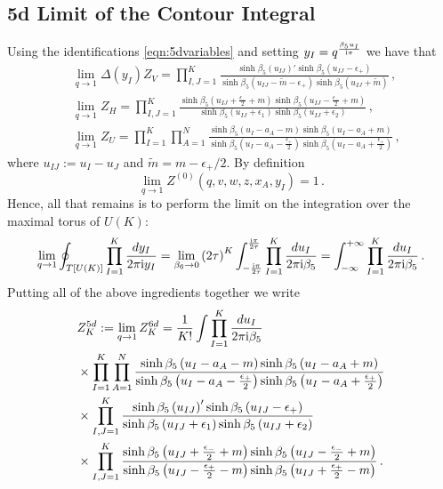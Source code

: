 \documentclass[main.tex]{subfiles}
\begin{document}
\subsection{5d Limit of the Contour Integral}\label{5dLimitOfUnorbifolded}
Using the identifications \eqref{eqn:5dvariables} and setting $y_I=q^{\frac{\beta_5u_I}{\mathrm{i}\pi}}$ we have that
\begin{align}
&\lim_{q\to1}\Delta(y_I)Z_V=\prod_{I,J=1}^K\frac{\sinh\beta_5\left(u_{IJ}\right)'\sinh\beta_5\left(u_{IJ}-\epsilon_+\right)}{\sinh\beta_5\left(u_{IJ}-\tilde{m}-\epsilon_+\right)\sinh\beta_5\left(u_{IJ}+\tilde{m}\right)}\,,\\
&\lim_{q\to1}Z_H=\prod_{I,J=1}^K\frac{\sinh\beta_5\left(u_{IJ}+\frac{\epsilon_-}{2}+m\right)\sinh\beta_5\left(u_{IJ}-\frac{\epsilon_-}{2}+m\right)}{\sinh\beta_5\left(u_{IJ}+\epsilon_1\right)\sinh\beta_5\left(u_{IJ}+\epsilon_2\right)}\,,\\
&\lim_{q\to1}Z_U=\prod_{I=1}^K\prod_{A=1}^N\frac{\sinh\beta_5\left(u_{I}-a_A-m\right)\sinh\beta_5\left(u_{I}-a_A+m\right)}{\sinh\beta_5\left(u_{I}-a_A-\frac{\epsilon_+}{2}\right)\sinh\beta_5\left(u_{I}-a_A+\frac{\epsilon_+}{2}\right)}\,,
\end{align}
where $u_{IJ}:=u_I-u_J$ and $\tilde{m}=m-\epsilon_+/2$.
By definition 
\begin{equation}
\lim_{q\to1}Z^{(0)}(q,v,w,z,x_A,y_I)=1\,.
\end{equation}
Hence, all that remains is to perform the limit on the integration over the maximal torus of $U(K)$:
\begin{equation}
\lim_{q\to1}\oint_{T\left[U\left(K\right)\right]}\prod_{I=1}^K\frac{dy_I}{2\pi\mathrm{i} y_I}=\lim_{\beta_6\to0}\left(2\tau\right)^K\int^{\frac{\mathrm{i}\pi}{2\tau}}_{-\frac{\mathrm{i}\pi}{2\tau}}\prod_{I=1}^K\frac{du_I}{2\pi\mathrm{i}\beta_5}=\int^{+\infty}_{-\infty}\prod_{I=1}^K\frac{du_I}{2\pi\mathrm{i}\beta_5}\,.
\end{equation}
Putting all of the above ingredients together we write
\begin{equation}\label{eqn:5dpartitionfunction}
\begin{aligned}
&Z^{5d}_K:=\lim_{q\to1}Z^{6d}_K=\frac{1}{K!}\int\prod_{I=1}^K\frac{du_I}{2\pi\mathrm{i}\beta_5}\\
&\times\prod_{I=1}^K\prod_{A=1}^N\frac{\sinh\beta_5\left(u_{I}-a_A-m\right)\sinh\beta_5\left(u_{I}-a_A+m\right)}{\sinh\beta_5\left(u_{I}-a_A-\frac{\epsilon_+}{2}\right)\sinh\beta_5\left(u_{I}-a_A+\frac{\epsilon_+}{2}\right)}\\
&\times\prod_{I,J=1}^K\frac{\sinh\beta_5\left(u_{IJ}\right)'\sinh\beta_5\left(u_{IJ}-\epsilon_+\right)}{\sinh\beta_5\left(u_{IJ}+\epsilon_1\right)\sinh\beta_5\left(u_{IJ}+\epsilon_2\right)}\\
&\times\prod_{I,J=1}^K\frac{\sinh\beta_5\left(u_{IJ}+\frac{\epsilon_-}{2}+m\right)\sinh\beta_5\left(u_{IJ}-\frac{\epsilon_-}{2}+m\right)}{\sinh\beta_5\left(u_{IJ}-\frac{\epsilon_+}{2}-m\right)\sinh\beta_5\left(u_{IJ}+\frac{\epsilon_+}{2}-m\right)}\,.
\end{aligned}
\end{equation}
\end{document}
